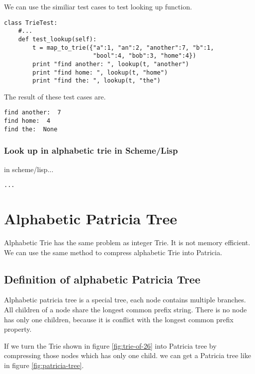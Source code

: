 \documentclass{article}
\begin{document}
We can use the similiar test cases to test looking up function.

\begin{lstlisting}
class TrieTest:
    #...
    def test_lookup(self):
        t = map_to_trie({"a":1, "an":2, "another":7, "b":1, 
                         "bool":4, "bob":3, "home":4})
        print "find another: ", lookup(t, "another")
        print "find home: ", lookup(t, "home")
        print "find the: ", lookup(t, "the")
\end{lstlisting}

The result of these test cases are.

\begin{verbatim}
find another:  7
find home:  4
find the:  None
\end{verbatim}

\subsubsection*{Look up in alphabetic trie in Scheme/Lisp}
in scheme/lisp...

\lstset{language=lisp}
\begin{lstlisting}
...
\end{lstlisting}

\section{Alphabetic Patricia Tree}
Alphabetic Trie has the same problem as integer Trie. It is not memory
efficient. We can use the same method to compress alphabetic Trie into
Patricia.

\subsection{Definition of alphabetic Patricia Tree}
Alphabetic patricia tree is a special tree, each node contains
multiple branches. All children of a node share the longest common 
prefix string. There is no node has only one children, because it
is conflict with the longest common prefix property.

If we turn the Trie shown in figure \ref{fig:trie-of-26} into Patricia
tree by compressing those nodes which has only one child. we can get
a Patricia tree like in figure \ref{fig:patricia-tree}.
\end{document}
